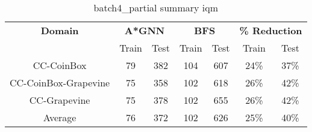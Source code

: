 \begin{table}[!ht]
  \small
  \centering
  \begin{tabular}{c|cc|cc|cc}
    \textbf{Domain}
      & \multicolumn{2}{c|}{\textbf{A*GNN}}
      & \multicolumn{2}{c|}{\textbf{BFS}}
      & \multicolumn{2}{c}{\textbf{\% Reduction}} \\
    \cline{2-7}
    & Train & Test & Train & Test & Train & Test \\
    \hline

    CC-CoinBox & 79 & 382 & 104 & 607 & 24\% & 37\% \\
    CC-CoinBox-Grapevine & 75 & 358 & 102 & 618 & 26\% & 42\% \\
    CC-Grapevine & 75 & 378 & 102 & 655 & 26\% & 42\% \\
    \hline
    Average & 76 & 372 & 102 & 626 & 25\% & 40\% \\

  \end{tabular}
  \caption{batch4_partial summary iqm}
  \label{tab:batch4_partial_res}
\end{table}
